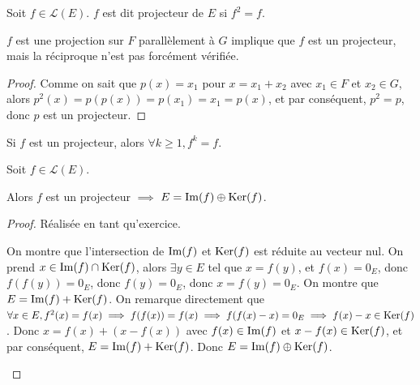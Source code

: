 \documentclass[12pt, a4paper]{report}
\begin{document}
\begin{definition}[Projecteur]
    Soit $f \in \mathcal L(E)$. $f$ est dit projecteur de $E$ si $f^2 = f$.
\end{definition}

\begin{remark}
    $f$ est une projection sur $F$ parallèlement à $G$ implique que $f$ est un projecteur, mais la réciproque n'est pas forcément vérifiée.
\end{remark}

\begin{proof}
    Comme on sait que $p(x) = x_1$ pour $x = x_1 + x_2$ avec $x_1 \in F$ et $x_2 \in G$, alors $p^2(x) = p(p(x)) = p(x_1) = x_1 = p(x)$, et par conséquent, $p^2 = p$, donc $p$ est un projecteur.
\end{proof}

\begin{consequence}
    Si $f$ est un projecteur, alors $\forall k \ge 1, f^k = f$.
\end{consequence}


\begin{property}
    Soit $f \in \mathcal L(E)$.
    
    Alors $f$ est un projecteur $\implies$ $E = \mathrm{Im}(f) \oplus \mathrm{Ker}(f)$.
\end{property}

\begin{proof}
    Réalisée en tant qu'exercice.

    \begin{outline}
        \1 On montre que l'intersection de $\mathrm{Im}(f)$ et $\mathrm{Ker}(f)$ est réduite au vecteur nul.
        \2 On prend $x \in \mathrm{Im}(f) \cap \mathrm{Ker}(f)$, alors $\exists y \in E$ tel que $x = f(y)$, et $f(x) = 0_E$, donc $f(f(y)) = 0_E$, donc $f(y) = 0_E$, donc $x = f(y) = 0_E$.
        \1 On montre que $E = \mathrm{Im}(f) + \mathrm{Ker}(f)$.
        \2 On remarque directement que $\forall x \in E, f^2(x) = f(x) \implies f(f(x)) = f(x) \implies f(f(x)-x)=0_E \implies f(x)-x \in \mathrm{Ker}(f)$. Donc $x = f(x) + (x - f(x))$ avec $f(x) \in \mathrm{Im}(f)$ et $x - f(x) \in \mathrm{Ker}(f)$, et par conséquent, $E = \mathrm{Im}(f) + \mathrm{Ker}(f)$.
        \1 Donc $E = \mathrm{Im}(f) \oplus \mathrm{Ker}(f)$.
    \end{outline}
\end{proof}
\end{document}
